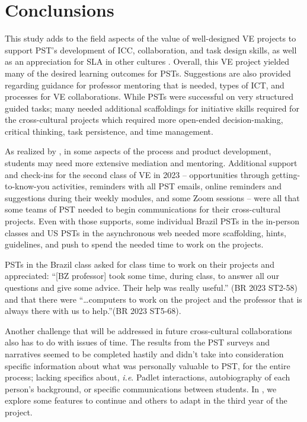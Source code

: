\section{Conclunsions} \label{sec-conclusions}

This study adds to the field aspects of the value of well-designed VE
projects to support PST's development of ICC, collaboration, and task
design skills, as well as an appreciation for SLA in other cultures
\cite{hanks2019research}. Overall, this VE project yielded many of the desired
learning outcomes for PSTs. Suggestions are also provided regarding
guidance for professor mentoring that is needed, types of ICT, and
processes for VE collaborations. While PSTs were successful on very
structured guided tasks; many needed additional scaffoldings for
initiative skills required for the cross-cultural projects which
required more open-ended decision-making, critical thinking, task
persistence, and time management.

As realized by \textcite{fuchs2022value}, in some aspects of the
process and product development, students may need more extensive
mediation and mentoring. Additional support and check-ins for the second
class of VE in 2023 -- opportunities through getting-to-know-you
activities, reminders with all PST emails, online reminders and
suggestions during their weekly modules, and some Zoom sessions -- were
all that some teams of PST needed to begin communications for their
cross-cultural projects. Even with those supports, some individual
Brazil PSTs in the in-person classes and US PSTs in the asynchronous web
needed more scaffolding, hints, guidelines, and push to spend the needed
time to work on the projects.

PSTs in the Brazil class asked for class time to work on their projects
and appreciated: \enquote{[BZ professor] took some time, during
class, to answer all our questions and give some advice. Their help was
really useful.} (BR 2023 ST2-58) and that there were
\enquote{\ldots computers to work on the project and the professor that
is always there with us to help.}(BR 2023 ST5-68).
		
Another challenge that will be addressed in future cross-cultural
collaborations also has to do with issues of time. The results from the
PST surveys and narratives seemed to be completed hastily and didn't
take into consideration specific information about what was personally
valuable to PST, for the entire process; lacking specifics about,
\emph{i.e}. Padlet interactions, autobiography of each person's
background, or specific communications between students. In , we
explore some features to continue and others to adapt in the third year
of the project.

